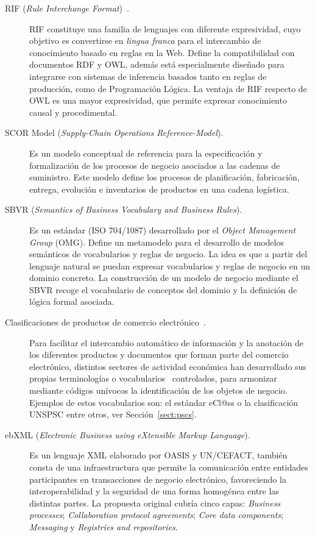 \begin{description}
\item[\gls{RIF} (\textit{Rule Interchange Format})~\cite{rif-core}.] RIF constituye una familia de lenguajes con diferente expresividad, 
cuyo objetivo es convertirse en \textit{lingua franca} para el intercambio de
conocimiento basado en reglas en la Web. Define la compatibilidad con
documentos RDF y OWL, además está especialmente diseñado para integrarse con
sistemas de inferencia basados tanto en reglas de producción, como de
Programación Lógica. La ventaja de RIF respecto de OWL es una mayor expresividad, 
que permite expresar conocimiento causal y procedimental. 


\item [\gls{SCOR} Model (\textit{Supply-Chain Operations Reference-Model}).] Es un modelo conceptual de
referencia para la especificación y formalización de los procesos de negocio
asociados a las cadenas de suministro. Este modelo define los procesos de
planificación, fabricación, entrega, evolución e inventarios de productos en una
cadena logística.

\item [\gls{SBVR} (\textit{Semantics of Business Vocabulary and Business Rules}).] Es un estándar
(ISO 704/1087) desarrollado por el \textit{Object Management Group} (\gls{OMG}). Define un
metamodelo para el desarrollo de modelos semánticos de vocabularios y reglas de
negocio. La idea es que a partir del lenguaje natural se puedan expresar
vocabularios y reglas de negocio en un dominio concreto. La construcción de un
modelo de negocio mediante el SBVR recoge el vocabulario de conceptos del
dominio y la definición de lógica formal asociada.

\item [Clasificaciones de productos de comercio electrónico~\cite{Leukel-ecatalog2005,Leukel-standard,Leukel-automating}.] Para
facilitar el intercambio automático de información y la anotación de los diferentes productos
y documentos que forman parte del comercio electrónico, distintos sectores de
actividad económica han desarrollado sus propias terminologías o
vocabularios~\cite{Norbert-class} controlados, para armonizar mediante códigos unívocos la identificación de
los objetos de negocio. Ejemplos de estos vocabularios son: el estándar eCl@ss o
la clasificación \gls{UNSPSC} entre otros, ver Sección~\ref{sect:pscs}.


\item [\gls{ebXML} (\textit{Electronic Business using eXtensible Markup Language}).] Es un lenguaje
\gls{XML} elaborado por \gls{OASIS} y UN/CEFACT, también consta de una infraestructura que permite la comunicación entre entidades
participantes en transacciones de negocio electrónico, favoreciendo la interoperabilidad y la seguridad de una forma homogénea entre las distintas partes.
La propuesta original cubría cinco capas: \textit{Business processes}; \textit{Collaboration protocol agreements};
\textit{Core data components}; \textit{Messaging} y \textit{Registries and repositories}.


\end{description}
